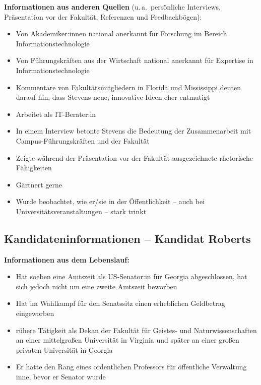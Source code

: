 \textbf{Informationen aus anderen Quellen}
(u.\,a.\ persönliche Interviews, Präsentation vor der Fakultät, Referenzen und Feedbackbögen):
\begin{itemize}
  \item Von Akademiker:innen national anerkannt für Forschung im Bereich Informationstechnologie
  \item Von Führungskräften aus der Wirtschaft national anerkannt für Expertise in Informationstechnologie
  \item Kommentare von Fakultätsmitgliedern in Florida und Mississippi deuten darauf hin, dass Stevens
    neue, innovative Ideen eher entmutigt
  \item Arbeitet als IT-Berater:in
  \item In einem Interview betonte Stevens die Bedeutung der Zusammenarbeit mit Campus-Führungskräften
    und der Fakultät
  \item Zeigte während der Präsentation vor der Fakultät ausgezeichnete rhetorische Fähigkeiten
  \item Gärtnert gerne
  \item Wurde beobachtet, wie er/sie in der Öffentlichkeit -- auch bei Universitätsveranstaltungen --
    stark trinkt
\end{itemize}

\clearpage
\subsection*{Kandidateninformationen -- Kandidat Roberts}
\thispagestyle{empty}

\textbf{Informationen aus dem Lebenslauf:}
\begin{itemize}
  \item Hat soeben eine Amtszeit als US-Senator:in für Georgia abgeschlossen, hat sich jedoch nicht um
    eine zweite Amtszeit beworben
  \item Hat im Wahlkampf für den Senatssitz einen erheblichen Geldbetrag eingeworben
  \item rühere Tätigkeit als Dekan der Fakultät für Geistes- und Naturwissenschaften an
    einer mittelgroßen Universität in Virginia und später an einer großen privaten
    Universität in Georgia
  \item Er hatte den Rang eines ordentlichen Professors für öffentliche Verwaltung inne,
    bevor er Senator wurde
\end{itemize}

